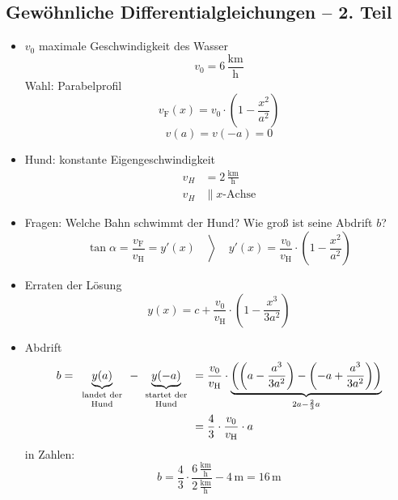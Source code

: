 \subsection{Gewöhnliche Differentialgleichungen -- 2. Teil}

\begin{example}
  \begin{itemize}
    \begingroup
    \newcommand{\kmh}{\ensuremath{\,\textstyle \frac{\text{km}}{\text{h}}}}
    \item $v_0$ maximale Geschwindigkeit des Wasser
      \begin{equation*} v_0 = 6 \kmh \end{equation*}
      Wahl: Parabelprofil
      \begin{equation*} v_\text{F}(x) = v_0 \cdot \left( 1 - \frac{x^2}{a^2} \right) \end{equation*}
      \begin{equation*} v(a) = v(-a) = 0 \end{equation*}
    \item Hund: konstante Eigengeschwindigkeit
      \begin{align*}
        v_H &= 2 \kmh \\
        v_H &\parallel \text{$x$-Achse}
      \end{align*}
    \item Fragen: Welche Bahn schwimmt der Hund? Wie groß ist seine Abdrift $b$?
      \begin{equation*} \left. \tan \alpha = \frac{v_\text{F}}{v_\text{H}} = y'(x) \quad\right\rangle\quad y'(x) = \frac{v_0}{v_\text{H}} \cdot \left( 1 - \frac{x^2}{a^2}\right)\end{equation*}
    \item Erraten der Lösung
      \begin{equation*}
      y(x) = c + \frac{v_0}{v_\text{H}} \cdot \left( 1 - \frac{x^3}{3a^2}\right)
      \end{equation*}
    \item Abdrift
      \begin{align*}
        b = \underbrace{y(a)}_{\parbox{16mm}{\centering\scriptsize landet der Hund}} -\underbrace{y(-a)}_{\parbox{16mm}{\centering\scriptsize startet der Hund}} &= \ds\frac{v_0}{v_\text{H}} \cdot \underbrace{\left( \left( a - \frac{a^3}{3a^2}\right) - \left( -a + \frac{a^3}{3a^2}\right) \right)}_{2a - \frac 2 3 a} \\
        &= \ds\frac 4 3 \cdot \frac{v_0}{v_\text{H}}\cdot  a
      \end{align*}
      in Zahlen:
      \begin{equation*}
        b = \frac 4 3 \cdot \frac {6 \kmh}{2 \kmh} - 4 \,\text{m} = 16 \,\text{m}
      \end{equation*}
    \endgroup
  \end{itemize}
\end{example}

